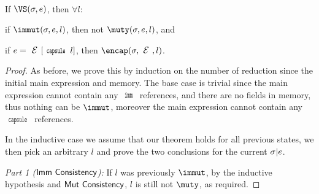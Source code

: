 \SS\begin{theorem}\ \\	
	\indent If $\VS(\s,e)$, then $\forall l$:
	\begin{ienumerate}
		\item if $\immut(\s,e,l)$, then not $\muty(\s,e,l)$, and
		\item if $e = \E[\Kw{capsule}\,l]$, then $\encap(\s,\E,l)$.
	\end{ienumerate}
\end{theorem}
\SS\begin{proof}
	\REFORMAT
	As before, we prove this by induction on the number of reduction since
	the initial main expression and memory. The base case is trivial since
	the main expression cannot contain any $\Kw{imm}$ references, and there
	are no fields in memory, thus nothing can be $\immut$, moreover the
	main expression cannot contain any $\Kw{capsule}$ references.
	
	In the inductive case we assume that our theorem holds for all previous
	states, we then pick an arbitrary $l$ and prove the two conclusions
	for the current $\sigma|e$.
	
	\emph{Part 1 ($\textsf{Imm Consistency}$): }If $l$ was previously $\immut$, by the inductive hypothesis and
	$\textsf{Mut Consistency}$, $l$ is still not $\muty$, as required.
	

\end{proof}
